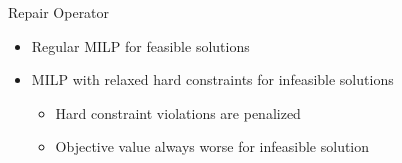 \documentclass[aspectratio=1610]{beamer}
\newcommand{\important}[1]{{\color{green!60!black}#1}}
\begin{document}
\begin{frame}{Repair Operator}
	
	\begin{itemize}
		\itemsep2ex
		\item Regular MILP for \important{feasible} solutions
		\item MILP with \important{relaxed} hard constraints for \important{infeasible} solutions
		\begin{itemize}
			\item Hard constraint violations are \important{penalized} 
			\item Objective value always \important{worse} for infeasible solution
		\end{itemize}
	\end{itemize}
\end{frame}
\end{document}
